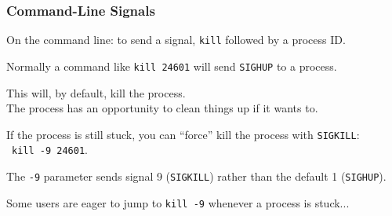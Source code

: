 \begin{frame}
\frametitle{Command-Line Signals}

On the command line: to send a signal, \texttt{kill} followed by a process ID. 

Normally a command like \texttt{kill 24601} will send \texttt{SIGHUP} to a process.

This will, by default, kill the process.\\
\quad The process has an opportunity to clean things up if it wants to. 

If the process is still stuck, you can ``force'' kill the process with \texttt{SIGKILL}:\\\ \quad \texttt{kill -9 24601}. 

The \texttt{-9} parameter sends signal 9 (\texttt{SIGKILL}) rather than the default 1 (\texttt{SIGHUP}). 

Some users are eager to jump to \texttt{kill -9} whenever a process is stuck...
\end{frame}








